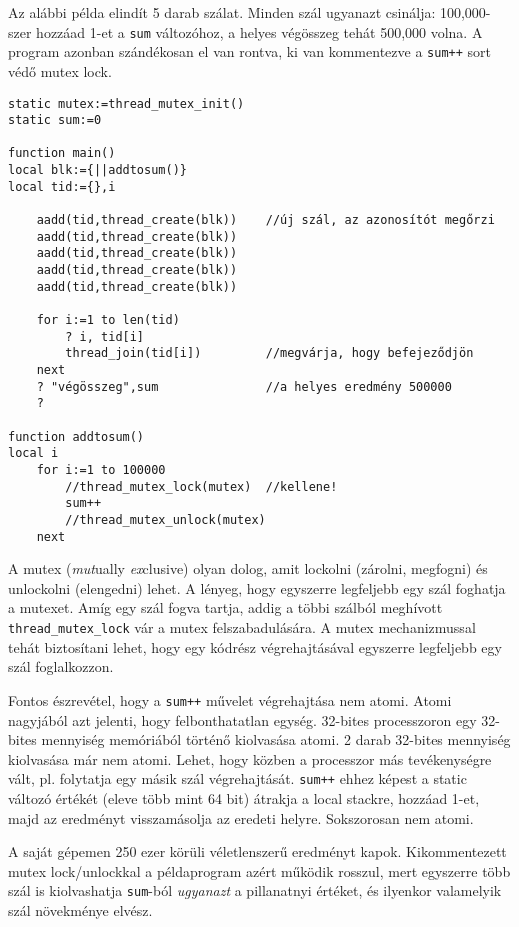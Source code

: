 Az alábbi példa elindít 5 darab szálat.
Minden szál ugyanazt csinálja: 100,000-szer hozzáad 1-et a \verb!sum! változóhoz,
a helyes végösszeg tehát 500,000 volna. A program azonban szándékosan el van rontva,
ki van kommentezve a \verb!sum++! sort védő mutex lock. 
\begin{verbatim}
static mutex:=thread_mutex_init()
static sum:=0

function main()
local blk:={||addtosum()}
local tid:={},i

    aadd(tid,thread_create(blk))    //új szál, az azonosítót megőrzi
    aadd(tid,thread_create(blk))
    aadd(tid,thread_create(blk))
    aadd(tid,thread_create(blk))
    aadd(tid,thread_create(blk))
    
    for i:=1 to len(tid)
        ? i, tid[i]
        thread_join(tid[i])         //megvárja, hogy befejeződjön
    next
    ? "végösszeg",sum               //a helyes eredmény 500000
    ?
    
function addtosum()
local i
    for i:=1 to 100000
        //thread_mutex_lock(mutex)  //kellene!
        sum++
        //thread_mutex_unlock(mutex)
    next
\end{verbatim}

A mutex ({\em mut\/}ually {\em ex\/}clusive) olyan dolog, 
amit lockolni (zárolni, megfogni) és unlockolni (elengedni) lehet.
A lényeg, hogy egyszerre legfeljebb egy szál foghatja a mutexet.
Amíg egy szál fogva tartja, 
addig a többi szálból meghívott \verb!thread_mutex_lock! vár
a mutex felszabadulására.  A mutex mechanizmussal tehát biztosítani lehet,
hogy egy kódrész végrehajtásával egyszerre legfeljebb egy szál foglalkozzon.

Fontos észrevétel, hogy a \verb!sum++! művelet végrehajtása nem atomi.
Atomi nagyjából azt jelenti, hogy felbonthatatlan egység. 32-bites processzoron
egy 32-bites mennyiség memóriából történő kiolvasása atomi. 2 darab
32-bites mennyiség kiolvasása már nem atomi. Lehet, hogy
közben a processzor más tevékenységre vált, pl. folytatja egy másik szál
végrehajtását. \verb!sum++! ehhez képest a static változó értékét 
(eleve több mint 64 bit) átrakja a local stackre, hozzáad 1-et, 
majd az eredményt visszamásolja az eredeti helyre. Sokszorosan nem atomi.

A saját gépemen 250 ezer körüli véletlenszerű eredményt kapok.
Kikommentezett mutex lock/unlockkal a példaprogram azért működik rosszul, 
mert egyszerre több szál is kiolvashatja \verb!sum!-ból {\em ugyanazt\/} 
a pillanatnyi értéket, és ilyenkor valamelyik szál növekménye elvész.



